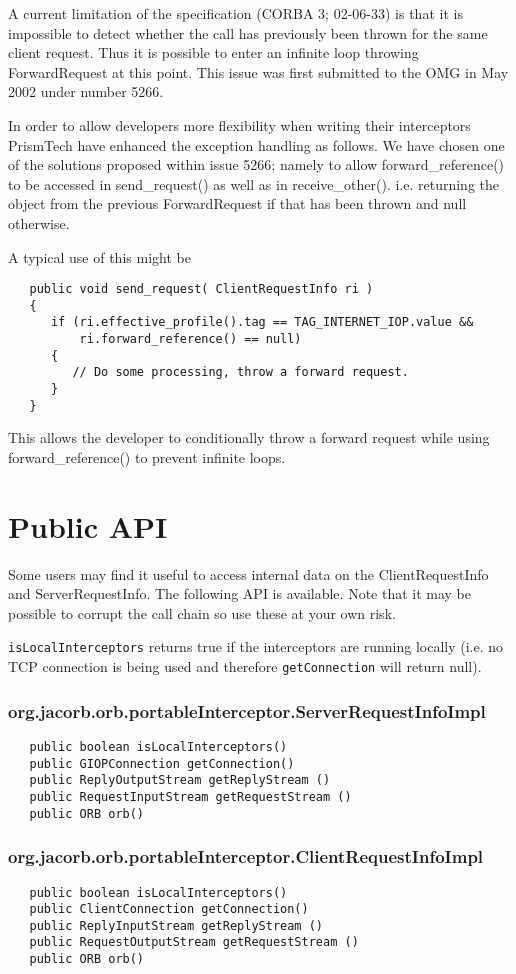 A current limitation of the specification (CORBA 3; 02-06-33) is that it is
impossible to detect whether the call has previously been thrown for the same
client request. Thus it is possible to enter an infinite loop throwing
ForwardRequest at this point. This issue was first submitted to the OMG in
May 2002 under number 5266.

In order to allow developers more flexibility when writing their interceptors
PrismTech have enhanced the exception handling as follows. We have chosen one of
the solutions proposed within issue 5266; namely to allow forward\_reference()
to be accessed in send\_request() as well as in receive\_other(). i.e. returning
the object from the previous ForwardRequest if that has been thrown and null
otherwise.

A typical use of this might be
\begin{verbatim}
   public void send_request( ClientRequestInfo ri )
   {
      if (ri.effective_profile().tag == TAG_INTERNET_IOP.value &&
          ri.forward_reference() == null)
      {
         // Do some processing, throw a forward request.
      }
   }
\end{verbatim}
This allows the developer to conditionally throw a forward request while using
forward\_reference() to prevent infinite loops.

\section{Public API}
Some users may find it useful to access internal data on the ClientRequestInfo and ServerRequestInfo. The following API is available. Note that it may be possible to corrupt the call chain so use these at your own risk.

{\tt isLocalInterceptors} returns true if the interceptors are running locally (i.e. no TCP
connection is being used and therefore {\tt getConnection} will return null).

\subsubsection{org.jacorb.orb.portableInterceptor.ServerRequestInfoImpl}
\begin{verbatim}
   public boolean isLocalInterceptors()
   public GIOPConnection getConnection()
   public ReplyOutputStream getReplyStream ()
   public RequestInputStream getRequestStream ()
   public ORB orb()
\end{verbatim}

\subsubsection{org.jacorb.orb.portableInterceptor.ClientRequestInfoImpl}
\begin{verbatim}
   public boolean isLocalInterceptors()
   public ClientConnection getConnection()
   public ReplyInputStream getReplyStream ()
   public RequestOutputStream getRequestStream ()
   public ORB orb()
\end{verbatim}


